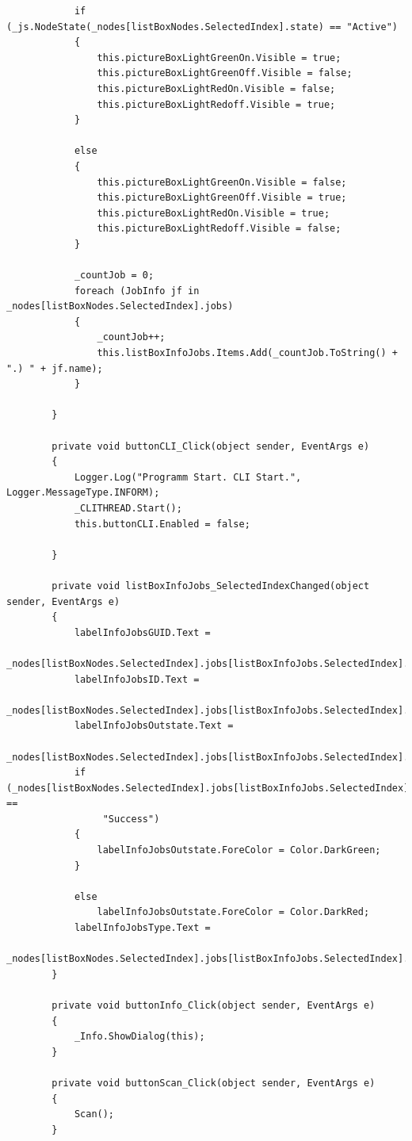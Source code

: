 \documentclass[12pt,a4paper]{report}
\begin{document}
\begin{onehalfspace}
\begin{lstlisting}
            if (_js.NodeState(_nodes[listBoxNodes.SelectedIndex].state) == "Active")
            {
                this.pictureBoxLightGreenOn.Visible = true;
                this.pictureBoxLightGreenOff.Visible = false;
                this.pictureBoxLightRedOn.Visible = false;
                this.pictureBoxLightRedoff.Visible = true;
            }

            else
            {
                this.pictureBoxLightGreenOn.Visible = false;
                this.pictureBoxLightGreenOff.Visible = true;
                this.pictureBoxLightRedOn.Visible = true;
                this.pictureBoxLightRedoff.Visible = false;
            }

            _countJob = 0;
            foreach (JobInfo jf in _nodes[listBoxNodes.SelectedIndex].jobs)
            {
                _countJob++;
                this.listBoxInfoJobs.Items.Add(_countJob.ToString() + ".) " + jf.name);
            }
            
        }

        private void buttonCLI_Click(object sender, EventArgs e)
        {
            Logger.Log("Programm Start. CLI Start.", Logger.MessageType.INFORM);
            _CLITHREAD.Start();
            this.buttonCLI.Enabled = false;

        }

        private void listBoxInfoJobs_SelectedIndexChanged(object sender, EventArgs e)
        {
            labelInfoJobsGUID.Text =
            	 _nodes[listBoxNodes.SelectedIndex].jobs[listBoxInfoJobs.SelectedIndex].guid.ToString();
            labelInfoJobsID.Text =
            	 _nodes[listBoxNodes.SelectedIndex].jobs[listBoxInfoJobs.SelectedIndex].id.ToString();
            labelInfoJobsOutstate.Text =
            	 _nodes[listBoxNodes.SelectedIndex].jobs[listBoxInfoJobs.SelectedIndex].outstate;
            if (_nodes[listBoxNodes.SelectedIndex].jobs[listBoxInfoJobs.SelectedIndex].outstate ==
            	 "Success")
            {
                labelInfoJobsOutstate.ForeColor = Color.DarkGreen;
            }

            else
                labelInfoJobsOutstate.ForeColor = Color.DarkRed;
            labelInfoJobsType.Text =
            	 _nodes[listBoxNodes.SelectedIndex].jobs[listBoxInfoJobs.SelectedIndex].type;
        }

        private void buttonInfo_Click(object sender, EventArgs e)
        {
            _Info.ShowDialog(this);
        }

        private void buttonScan_Click(object sender, EventArgs e)
        {
            Scan();
        }


\end{lstlisting}
\end{onehalfspace}
\end{document}
